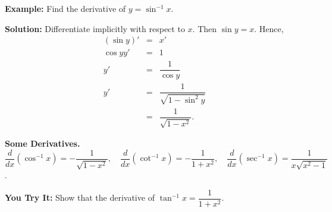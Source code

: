 \documentclass[titlepage,a4paper,12pt]{report}
\begin{document}
\noindent \textbf{Example:} Find the derivative of $y=\sin ^{-1} x$.

\noindent \textbf{Solution:} Differentiate implicitly with respect to $x$. Then $\sin y =x$. Hence,  
\begin{eqnarray*}
(\sin y)' &=& x'\\
\cos y y' &=& 1\\
y' &=& \dfrac{1}{\cos y} \\
y' &=& \dfrac{1}{\sqrt{1-\sin ^2 y}}\\
&=& \dfrac{1}{\sqrt{1-x^2}}.
\end{eqnarray*}

\noindent \textbf{Some Derivatives.} $\dfrac{d}{dx} (\cos ^{-1} x)=-\dfrac{1}{\sqrt{1-x^2}}, \quad \dfrac{d}{dx}(\cot ^{-1} x) =-\dfrac{1}{1+x^2}, \quad \dfrac{d}{dx}(\sec ^{-1}x)=\dfrac{1}{x\sqrt{x^2-1}}$.

\noindent \textbf{You Try It:} Show that the derivative of $\tan ^{-1} x =\dfrac{1}{1+x^2}$.
\end{document}
